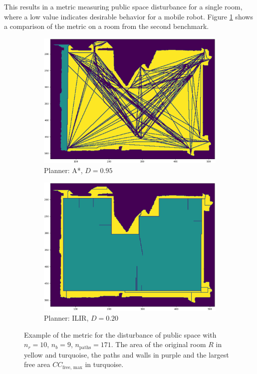 This results in a metric measuring public space disturbance for a single room, where a low value indicates desirable behavior for a mobile robot. Figure \ref{fig:disturbance_example} shows a comparison of the metric on a room from the second benchmark.

\begin{figure}[h]
    \captionsetup[subfigure]{justification=centering}
    \centering
    \begin{subfigure}{.5\textwidth}
      \centering
      \includegraphics[width=\textwidth]{figures/30_methods/room9_disturbance_astar_smooth.png}
      \caption{Planner: A*, \(D = 0.95\)}
    \end{subfigure}%
    \begin{subfigure}{.5\textwidth}
      \centering
      \includegraphics[width=.975\textwidth]{figures/30_methods/room9_disturbance_ilir_smooth.png}
      \caption{Planner: ILIR, \(D = 0.20\)}
    \end{subfigure}
    \caption[Example of the metric for disturbance of public space]{Example of the metric for the disturbance of public space with \(n_r=10\), \(n_b=9\), \(n_{\text{paths}}=171\). The area of the original room \(R\) in yellow and turquoise, the paths and walls in purple and the largest free area \(CC_{\text{free, max}}\) in turquoise.}
    \label{fig:disturbance_example}
\end{figure}


